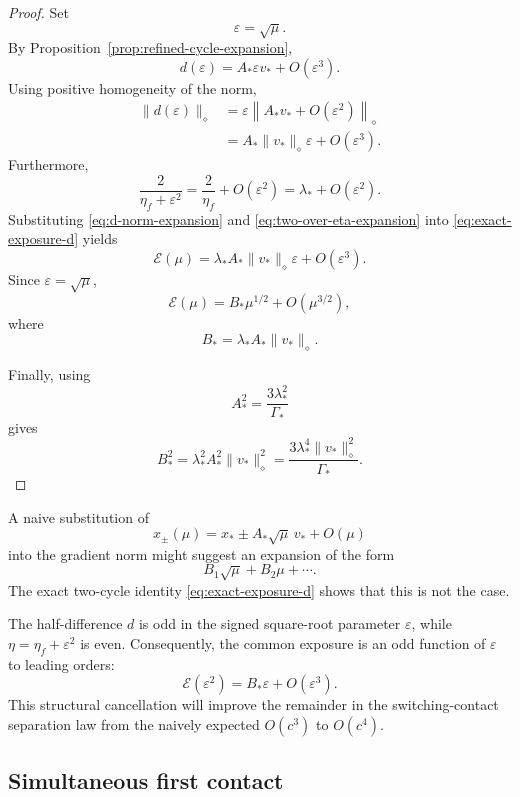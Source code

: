 \begin{proof}
Set
\[
\varepsilon=\sqrt{\mu}.
\]
By Proposition~\ref{prop:refined-cycle-expansion},
\[
d(\varepsilon)
=
A_*\varepsilon v_*
+
O(\varepsilon^3).
\]
Using positive homogeneity of the norm,
\begin{align}
\|d(\varepsilon)\|_\diamond
&=
\varepsilon
\left\|
A_*v_*
+
O(\varepsilon^2)
\right\|_\diamond
\nonumber\\
&=
A_*
\|v_*\|_\diamond
\varepsilon
+
O(\varepsilon^3).
\label{eq:d-norm-expansion}
\end{align}
Furthermore,
\begin{equation}
\frac{2}{\eta_f+\varepsilon^2}
=
\frac{2}{\eta_f}
+
O(\varepsilon^2)
=
\lambda_*
+
O(\varepsilon^2).
\label{eq:two-over-eta-expansion}
\end{equation}
Substituting
\eqref{eq:d-norm-expansion} and
\eqref{eq:two-over-eta-expansion} into
\eqref{eq:exact-exposure-d} yields
\[
\mathscr E(\mu)
=
\lambda_*A_*
\|v_*\|_\diamond
\varepsilon
+
O(\varepsilon^3).
\]
Since $\varepsilon=\sqrt{\mu}$,
\[
\mathscr E(\mu)
=
B_*\mu^{1/2}
+
O(\mu^{3/2}),
\]
where
\[
B_*
=
\lambda_*A_*
\|v_*\|_\diamond.
\]

Finally, using
\[
A_*^2
=
\frac{3\lambda_*^2}{\Gamma_*}
\]
gives
\[
B_*^2
=
\lambda_*^2
A_*^2
\|v_*\|_\diamond^2
=
\frac{
3\lambda_*^4
\|v_*\|_\diamond^2
}{
\Gamma_*
}.
\]
\end{proof}

\begin{remark}
\label{rem:no-mu-term}
A naive substitution of
\[
x_\pm(\mu)
=
x_*
\pm
A_*\sqrt{\mu}\,v_*
+
O(\mu)
\]
into the gradient norm might suggest an expansion of the form
\[
B_1\sqrt{\mu}+B_2\mu+\cdots.
\]
The exact two-cycle identity
\eqref{eq:exact-exposure-d} shows that this is not the case.

The half-difference $d$ is odd in the signed square-root parameter
$\varepsilon$, while $\eta=\eta_f+\varepsilon^2$ is even.
Consequently, the common exposure is an odd function of
$\varepsilon$ to leading orders:
\[
\mathscr E(\varepsilon^2)
=
B_*\varepsilon
+
O(\varepsilon^3).
\]
This structural cancellation will improve the remainder in the
switching-contact separation law from the naively expected
$O(c^3)$ to $O(c^4)$.
\end{remark}

\subsection{Simultaneous first contact}
\label{subsec:simultaneous-contact}


